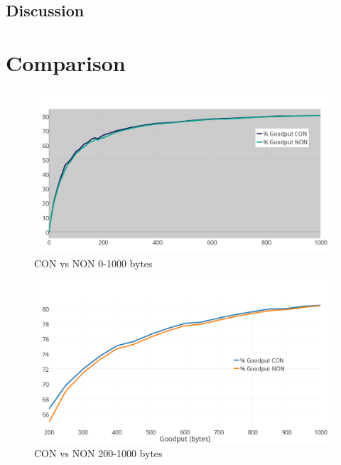 








\subsection{Discussion}

\section{Comparison}



\begin{figure}[ht]
    \centering
    \includegraphics[scale=1.0]{CONvsNONplot_0-k_thickerGRAY.png}    
    \caption{CON vs NON 0-1000 bytes}
    \label{fig:CONvsNON0-1000}
\end{figure}

\begin{figure}[ht]
    \centering
    \includegraphics[scale=1.0]{CONvsNON200-1000thick.png}    
    \caption{CON vs NON 200-1000 bytes}
    \label{fig:CONvsNON200-1000}
\end{figure}

